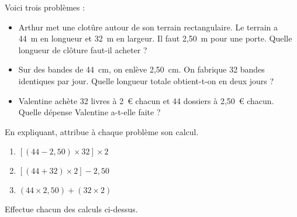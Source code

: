 Voici trois problèmes :
\begin{itemize}
\item[\ding{172}] Arthur met une clotûre autour de son terrain
rectangulaire. Le terrain a 44~m en longueur et 32~m en largeur. Il
faut 2,50~m pour une porte. Quelle longueur de clôture faut-il acheter
?
\item[\ding{173}] Sur des bandes de 44~cm, on enlève 2,50~cm. On
fabrique 32 bandes identiques par jour. Quelle longueur totale
obtient-t-on en deux jours ?
\item[\ding{174}] Valentine achète 32 livres à 2~\textgreek{\euro}
chacun et 44 dossiers à 2,50~\textgreek{\euro} chacun. Quelle dépense
Valentine a-t-elle faite ?
\end{itemize}
\begin{myenumerate}
\item En expliquant, attribue à chaque problème son calcul.
\begin{enumerate}
\item $[(44-2,50)\times32]\times2$
\item $[(44+32)\times2]-2,50$
\item $(44\times2,50)+(32\times2)$
\end{enumerate}
\item Effectue chacun des calculs ci-dessus.
\end{myenumerate}
